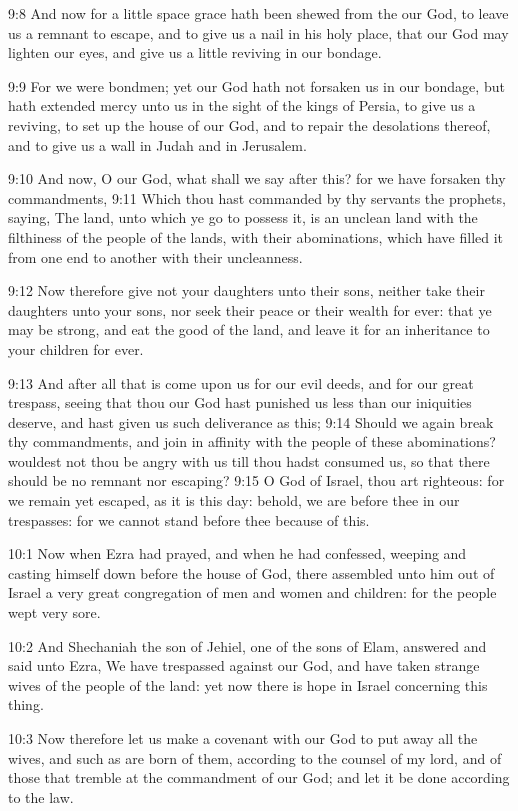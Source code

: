 9:8 And now for a little space grace hath been shewed from the \LORD our God, to leave us a remnant to escape, and to give us a nail in his holy place, that our God may lighten our eyes, and give us a little reviving in our bondage.

9:9 For we were bondmen; yet our God hath not forsaken us in our bondage, but hath extended mercy unto us in the sight of the kings of Persia, to give us a reviving, to set up the house of our God, and to repair the desolations thereof, and to give us a wall in Judah and in Jerusalem.

9:10 And now, O our God, what shall we say after this? for we have forsaken thy commandments, 9:11 Which thou hast commanded by thy servants the prophets, saying, The land, unto which ye go to possess it, is an unclean land with the filthiness of the people of the lands, with their abominations, which have filled it from one end to another with their uncleanness.

9:12 Now therefore give not your daughters unto their sons, neither take their daughters unto your sons, nor seek their peace or their wealth for ever: that ye may be strong, and eat the good of the land, and leave it for an inheritance to your children for ever.

9:13 And after all that is come upon us for our evil deeds, and for our great trespass, seeing that thou our God hast punished us less than our iniquities deserve, and hast given us such deliverance as this; 9:14 Should we again break thy commandments, and join in affinity with the people of these abominations? wouldest not thou be angry with us till thou hadst consumed us, so that there should be no remnant nor escaping?  9:15 O \LORD God of Israel, thou art righteous: for we remain yet escaped, as it is this day: behold, we are before thee in our trespasses: for we cannot stand before thee because of this.

10:1 Now when Ezra had prayed, and when he had confessed, weeping and casting himself down before the house of God, there assembled unto him out of Israel a very great congregation of men and women and children: for the people wept very sore.

10:2 And Shechaniah the son of Jehiel, one of the sons of Elam, answered and said unto Ezra, We have trespassed against our God, and have taken strange wives of the people of the land: yet now there is hope in Israel concerning this thing.

10:3 Now therefore let us make a covenant with our God to put away all the wives, and such as are born of them, according to the counsel of my lord, and of those that tremble at the commandment of our God; and let it be done according to the law.

